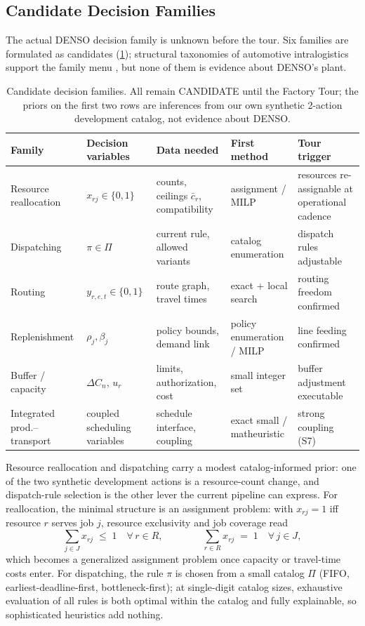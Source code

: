 \documentclass[11pt,a4paper]{article}
\begin{document}
\subsection{Candidate Decision Families}\label{sec:families}

The actual DENSO decision family is unknown before the tour. Six families
are formulated as candidates (\cref{tab:families}); structural taxonomies of
automotive intralogistics support the family menu
\cite{boysen2015part,leanh2006agv,fragapane2021amr}, but none of them is
evidence about DENSO's plant.

\begin{table}[htbp]
\centering\small
\caption{Candidate decision families. All remain CANDIDATE until the
Factory Tour; the priors on the first two rows are inferences from our own
synthetic 2-action development catalog, not evidence about DENSO.}
\label{tab:families}
\begin{tabular}{@{}p{2.6cm}p{2.6cm}p{3.4cm}p{3.0cm}p{2.6cm}@{}}
\toprule
Family & Decision variables & Data needed & First method & Tour trigger \\
\midrule
Resource reallocation & $x_{rj} \in \{0,1\}$ & counts, ceilings
$\bar{c}_r$, compatibility & assignment / MILP & resources re-assignable at
operational cadence \\
Dispatching & $\pi \in \Pi$ & current rule, allowed variants & catalog
enumeration & dispatch rules adjustable \\
Routing & $y_{r,e,t} \in \{0,1\}$ & route graph, travel times & exact + local
search & routing freedom confirmed \\
Replenishment & $\rho_j, \beta_j$ & policy bounds, demand link & policy
enumeration / MILP & line feeding confirmed \\
Buffer / capacity & $\Delta C_n$, $u_r$ & limits, authorization, cost & small
integer set & buffer adjustment executable \\
Integrated prod.--transport & coupled scheduling variables & schedule
interface, coupling & exact small / matheuristic & strong coupling (S7) \\
\bottomrule
\end{tabular}
\end{table}

Resource reallocation and dispatching carry a modest catalog-informed prior:
one of the two synthetic development actions is a resource-count change, and
dispatch-rule selection is the other lever the current pipeline can express.
For reallocation, the minimal structure is an assignment problem: with
$x_{rj} = 1$ iff resource $r$ serves job $j$, resource exclusivity and job
coverage read
\begin{equation}\label{eq:exclusivity}
\sum_{j \in J} x_{rj} \;\le\; 1 \quad \forall\, r \in R,
\qquad\qquad
\sum_{r \in R} x_{rj} \;=\; 1 \quad \forall\, j \in J,
\end{equation}
which becomes a generalized assignment problem once capacity or travel-time
costs enter. For dispatching, the rule $\pi$ is chosen from a small catalog
$\Pi$ (FIFO, earliest-deadline-first, bottleneck-first); at single-digit
catalog sizes, exhaustive evaluation of all rules is both optimal within the
catalog and fully explainable, so sophisticated heuristics add nothing.
\end{document}
